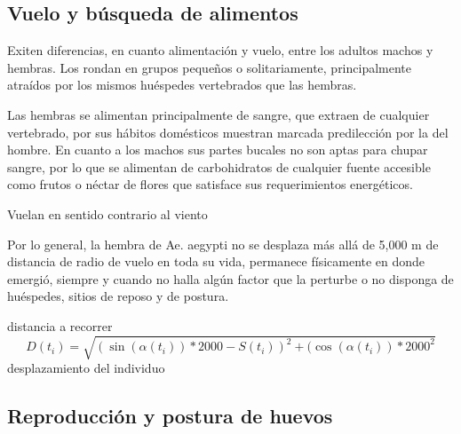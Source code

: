 \subsection{Vuelo y búsqueda de alimentos}
Exiten diferencias, en cuanto alimentación y vuelo, entre los adultos
machos y hembras. Los rondan en grupos pequeños o solitariamente,
principalmente atraídos por los mismos huéspedes vertebrados que las hembras.

Las hembras se alimentan principalmente de sangre, que extraen de cualquier
vertebrado, por sus hábitos domésticos muestran marcada predilección por
la del hombre\cite{ThironIzcazaJ2003}. En cuanto a los machos sus partes
bucales no son aptas para chupar sangre, por lo que se alimentan de
carbohidratos de cualquier fuente accesible como frutos o néctar de flores
que satisface sus requerimientos energéticos.

Vuelan en sentido contrario al viento

Por lo general, la hembra de Ae. aegypti no se desplaza más allá de
5,000 m de distancia de radio de vuelo en toda su vida, permanece
físicamente en donde emergió, siempre y cuando no halla algún factor
que la perturbe o no disponga de huéspedes, sitios de reposo y de
postura.


distancia a recorrer
\begin{equation}
 D (t_{i}) = \sqrt{{(\sin(\alpha(t_{i})) * 2000 - S(t_{i}))}^{2}
  + {(\cos(\alpha(t_{i})) * 2000} ^{2} }
\end{equation}
desplazamiento del individuo


\subsection{Reproducción y postura de huevos}


